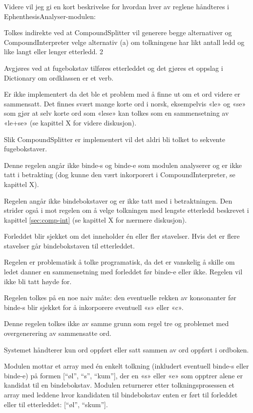 Videre vil jeg gi en kort beskrivelse for hvordan hver av reglene håndteres i EphenthesisAnalyser-modulen: 
\begin{inparaenum}[ 1)]
\item Tolkes indirekte ved at CompoundSplitter vil generere begge alternativer og CompoundInterpreter velge alternativ (a) om tolkningene har likt antall ledd og like langt eller lenger etterledd. 2
\item Avgjøres ved at fugebokstav tilføres etterleddet og det gjøres et oppslag i Dictionary om ordklassen er et verb. 
\item Er ikke implementert da det ble et problem med å finne ut om et ord videre er sammensatt. Det finnes svært mange korte ord i norsk, eksempelvis «le» og «se» som gjør at selv korte ord som «lese» kan tolkes som en sammensetning av «le+se» (se kapittel X for videre diskusjon). 
\item Slik CompoundSplitter er implementert vil det aldri bli tolket to sekvente fugebokstaver. 
\item Denne regelen angår ikke binde-s og binde-e som modulen analyserer og er ikke tatt i betrakting (dog kunne den vært inkorporert i CompoundInterpreter, se kapittel X). 
\item Regelen angår ikke bindebokstaver og er ikke tatt med i betraktningen. Den strider også i mot regelen om å velge tolkningen med lengste etterledd beskrevet i kapittel \ref{sec:comp-int} (se kapittel X for nærmere diskusjon). 
\item Forleddet blir sjekket om det inneholder én eller fler stavelser. Hvis det er flere stavelser går bindebokstaven til etterleddet. 
\item Regelen er problematisk å tolke programatisk, da det er vanskelig å skille om ledet danner en sammensetning med forleddet før binde-e eller ikke. Regelen vil ikke bli tatt høyde for. 
\item Regelen tolkes på en noe naiv måte: den eventuelle rekken av konsonanter før binde-s blir sjekket for å inkorporere eventuell «s» eller «c». 
\item Denne regelen tolkes ikke av samme grunn som regel tre og problemet med overgenerering av sammensatte ord. 
\item Systemet håndterer kun ord oppført eller satt sammen av ord oppført i ordboken.
\end{inparaenum}

Modulen mottar et array med én enkelt tolkning (inkludert eventuell binde-s eller binde-e) på formen [“øl”, “s”, “kum”], der en «s» eller «e» som opptrer alene er kandidat til en bindebokstav. Modulen returnerer etter tolkningsprosessen et array med leddene hvor kandidaten til bindebokstav enten er ført til forleddet eller til etterleddet: [“øl”, “skum”]. 

